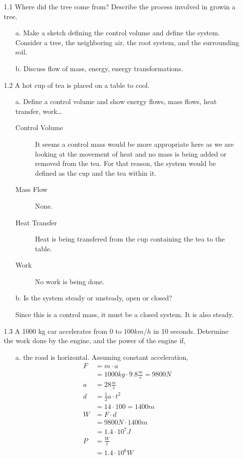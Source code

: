 \documentclass[10pt, a4paper]{article}
\begin{document}

\begin{enumerate}
  \item[1.1] Where did the tree come from? Describe the process involved in growin a tree.
    \begin{enumerate}
      \item[a.] Make a sketch defining the control volume and define the system. Consider a tree, the neighboring air, the root system, and the surrounding soil.
      \item[b.] Discuss flow of mass, energy, energy transformations.
    \end{enumerate}

  \item[1.2] A hot cup of tea is placed on a table to cool.
    \begin{enumerate}
      \item[a.] Define a control volume and show energy flows, mass flows, heat transfer, work\dots
        \begin{description}
          \item[Control Volume] It seems a control mass would be more appropriate here as we are looking at the movement of heat and no mass is being added or removed from the tea. For that reason, the system would be defined as the cup and the tea within it.
          \item[Mass Flow] None.
          \item[Heat Transfer] Heat is being transfered from the cup containing the tea to the table.
          \item[Work] No work is being done.
        \end{description}
      \item[b.] Is the system steady or unsteady, open or closed?
        
        Since this is a control mass, it must be a closed system. It is also steady.
    \end{enumerate}

  \item[1.3] A 1000 kg car accelerates from 0 to $100 km/h$ in 10 seconds. Determine the work done by the engine, and the power of the engine if,
    \begin{enumerate}
      \item[a.] the road is horizontal. Assuming constant acceleration,
        \begin{align*}
         F &= m \cdot a \\
         &= 1000kg \cdot 9.8\frac{m}{s} = 9800 N \\
         a &= 28\frac{m}{s} \\
         d &= \frac{1}{2}a\cdot t^2 \\
           &= 14 \cdot 100 = 1400 m \\  
         W &= F \cdot d \\
           &= 9800N \cdot 1400 m \\
           &= 1.4 \cdot 10^{7} J \\
         P &= \frac{W}{t} \\
           &= 1.4 \cdot 10^{6} W
       \end{align*}


\end{enumerate}
\end{enumerate}
\end{document}
